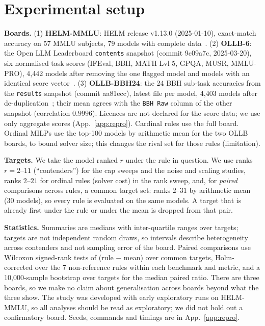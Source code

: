 \documentclass{article}
\theoremstyle{remark}
\begin{document}
\section{Experimental setup}\label{sec:setup}
\textbf{Boards.} (1) \textbf{HELM-MMLU}: HELM release v1.13.0 (2025-01-10), exact-match accuracy on 57 MMLU subjects, 79 models with complete data~\citep{helm_release}. (2) \textbf{OLLB-6}: the Open LLM Leaderboard \texttt{contents} snapshot (commit 9c09a7c, 2025-03-20), six normalised task scores (IFEval, BBH, MATH Lvl 5, GPQA, MUSR, MMLU-PRO), 4,442 models after removing the one flagged model and models with an identical score vector~\citep{ollb_contents}. (3) \textbf{OLLB-BBH24}: the 24 BBH sub-task accuracies from the \texttt{results} snapshot (commit aa81ecc), latest file per model, 4,403 models after de-duplication~\citep{ollb_results}; their mean agrees with the \texttt{BBH Raw} column of the other snapshot (correlation $0.9996$). Licences are not declared for the score data; we use only aggregate scores (App.~\ref{app:repro}). Cardinal rules use the full board. Ordinal MILPs use the top-100 models by arithmetic mean for the two OLLB boards, to bound solver size; this changes the rival set for those rules (limitation).

\textbf{Targets.} We take the model ranked $r$ under the rule in question. We use ranks $r=2$--$11$ (``contenders'') for the cap sweeps and the noise and scaling studies, ranks $2$--$21$ for ordinal rules (solver cost) in the rank sweep, and, for \emph{paired} comparisons across rules, a common target set: ranks $2$--$31$ by arithmetic mean (30 models), so every rule is evaluated on the same models. A target that is already first under the rule or under the mean is dropped from that pair.

\textbf{Statistics.} Summaries are medians with inter-quartile ranges over targets; targets are not independent random draws, so intervals describe heterogeneity across contenders and not sampling error of the board. Paired comparisons use Wilcoxon signed-rank tests of (rule $-$ mean) over common targets, Holm-corrected over the 7 non-reference rules within each benchmark and metric, and a 10,000-sample bootstrap over targets for the median paired ratio. There are three boards, so we make no claim about generalisation across boards beyond what the three show. The study was developed with early exploratory runs on HELM-MMLU, so all analyses should be read as exploratory; we did not hold out a confirmatory board. Seeds, commands and timings are in App.~\ref{app:repro}.
\end{document}
